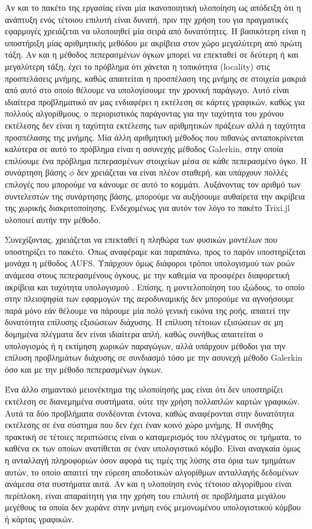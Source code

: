 Αν και το πακέτο της εργασίας είναι μία ικανοποιητική υλοποίηση ως απόδειξη ότι η ανάπτυξη ενός τέτοιου επιλυτή είναι δυνατή, πριν την χρήση του για πραγματικές εφαρμογές χρειάζεται να υλοποιηθεί μία σειρά από δυνατότητες.
Η βασικότερη είναι η υποστήριξη μίας αριθμητικής μεθόδου με ακρίβεια στον χώρο μεγαλύτερη από πρώτη τάξη.
Αν και η μέθοδος πεπερασμένων όγκων μπορεί να επεκταθεί σε δεύτερη ή και μεγαλύτερη τάξη, έχει το πρόβλημα ότι χάνεται η τοπικότητα (locality) στις προσπελάσεις μνήμης, καθώς απαιτείται η προσπέλαση της μνήμης σε στοιχεία μακριά από αυτό στο οποίο θέλουμε να υπολογίσουμε την χρονική παράγωγο.
Αυτό είναι ιδιαίτερα προβληματικό αν μας ενδιαφέρει η εκτέλεση σε κάρτες γραφικών, καθώς για πολλούς αλγορίθμους, ο περιοριστικός παράγοντας για την ταχύτητα του χρόνου εκτέλεσης δεν είναι η ταχύτητα εκτέλεσης των αριθμητικών πράξεων αλλά η ταχύτητα προσπέλασης της μνήμης.
Μία άλλη αριθμητική μέθοδος που πιθανώς ανταποκρίνεται καλύτερα σε αυτό το πρόβλημα είναι η ασυνεχής μέθοδος Galerkin, στην οποία επιλύουμε ένα πρόβλημα πεπερασμένων στοιχείων μέσα σε κάθε πεπερασμένο όγκο.
Η συνάρτηση βάσης $\phi$ δεν χρειάζεται να είναι πλέον σταθερή, και υπάρχουν πολλές επιλογές που μπορούμε να κάνουμε σε αυτό το κομμάτι.
Αυξάνοντας τον αριθμό των συντελεστών της συνάρτησης βάσης, μπορούμε να αυξήσουμε αυθαίρετα την ακρίβεια της χωρικής διακριτοποίησης.
Ενδεχομένως για αυτόν τον λόγο το πακέτο Trixi.jl \cite{Trixi2020} υλοποιεί αυτήν την μέθοδο.

Συνεχίζοντας, χρειάζεται να επεκταθεί η πληθώρα των φυσικών μοντέλων που υποστηρίζει το πακέτο.
Όπως αναφέραμε και παραπάνω, προς το παρόν υποστηρίζεται μονάχα η μέθοδος AUFS.
Υπάρχουν όμως διάφοροι τρόποι υπολογισμού των ροών ανάμεσα στους πεπερασμένους όγκους, με την καθεμία να προσφέρει διαφορετική ακρίβεια και ταχύτητα υπολογισμού \cite{Toro2012}.
Επίσης, η μοντελοποίηση του ιξώδους, το οποίο στην πλειοψηφία των εφαρμογών της αεροδυναμικής δεν μπορούμε να αγνοήσουμε παρά μόνο εάν θέλουμε να πάρουμε μία πολύ γενική εικόνα της ροής, απαιτεί την δυνατότητα επίλυσης εξισώσεων διάχυσης.
Η επίλυση τέτοιων εξισώσεων σε μη δομημένα πλέγματα δεν είναι ιδιαίτερα απλή, καθώς συνήθως απαιτείται ο υπολογισμός ή η εκτίμηση χωρικών παραγώγων, αλλά υπάρχουν μέθοδοι για την επίλυση προβλημάτων διάχυσης σε συνδιασμό τόσο με την ασυνεχή μέθοδο Galerkin όσο και με την μέθοδο πεπερασμένων όγκων.

Ένα άλλο σημαντικό μειονέκτημα της υλοποίησής μας είναι ότι δεν υποστηρίζει εκτέλεση σε διανεμημένα συστήματα, ούτε την χρήση πολλαπλών καρτών γραφικών.
Αυτά τα δύο προβλήματα συνδέονται έντονα, καθώς αναφέρονται στην δυνατότητα εκτέλεσης σε ένα σύστημα που δεν έχει έναν κοινό χώρο μνήμης.
Η συνήθης πρακτική σε τέτοιες περιπτώσεις είναι ο καταμερισμός του πλέγματος σε τμήματα, το καθένα εκ των οποίων ανατίθεται σε έναν υπολογιστικό κόμβο.
Είναι αναγκαία όμως η ανταλλαγή πληροφοριών όσον αφορά τις τιμές της λύσης στα όρια των τμημάτων αυτών, το οποίο απαιτεί την εύρεση αποδοτικών αλγορίθμων ανταλλαγής δεδομένων ανάμεσα στα συστήματα αυτά.
Αν και η υλοποίηση ενός τέτοιου αλγορίθμου είναι περίπλοκη, είναι απαραίτητη για την χρήση του επιλυτή σε προβλήματα μεγάλου μεγέθους τα οποία δεν χωράνε στην μνήμη ενός μεμονωμένου υπολογιστικού κόμβου ή κάρτας γραφικών.

